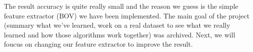The result accuracy is quite really small and the reason we guess is the simple feature extractor (BOV) we have been implemented. The main goal of the project (summary what we've learned, work on a real dataset to see what we really learned and how those algorithms work together) was archived. Next, we will foucus on changing our feature extractor to improve the result.
